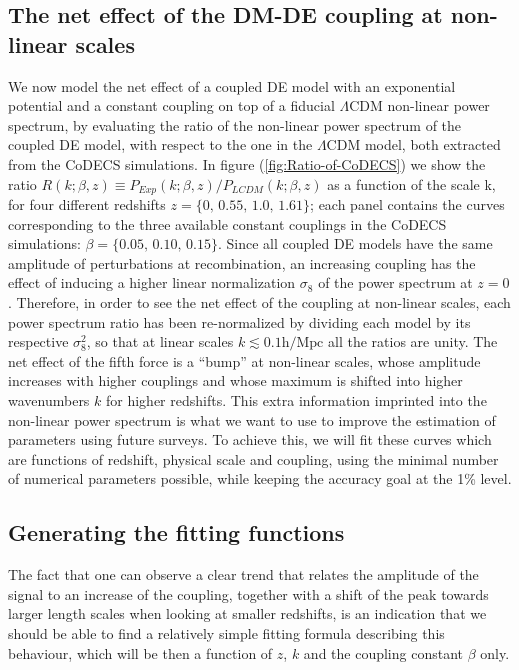 \subsection{The net effect of the DM-DE coupling at non-linear scales}

We now model the net effect of a coupled DE model with an exponential
potential and a constant coupling on top of a fiducial $\Lambda$CDM
non-linear power spectrum, by evaluating the ratio of the non-linear
power spectrum of the coupled DE model, with respect to the one in
the $\Lambda$CDM model, both extracted from the CoDECS simulations.
In figure (\ref{fig:Ratio-of-CoDECS}) we show the ratio $R(k;\beta,z)\equiv P_{Exp}(k;\beta,z)/P_{LCDM}(k;\beta,z)$
as a function of the scale k, for four different redshifts $z=\{0,\,0.55,\,1.0,\,1.61\}$;
each panel contains the curves corresponding to the three available
constant couplings in the CoDECS simulations: \textbf{$\beta=\{0.05,\,0.10,\,0.15\}$}.
Since all coupled DE models have the same amplitude of perturbations
at recombination, an increasing coupling has the effect of inducing
a higher linear normalization $\sigma_{8}$ of the power spectrum
at $z=0$ \citep{baldi_codecs_2012}. Therefore, in order to see the
net effect of the coupling at non-linear scales, each power spectrum
ratio has been re-normalized by dividing each model by its respective
$\sigma_{8}^{2}$, so that at linear scales $k\lesssim0.1\mbox{h}/\mbox{Mpc}$
all the ratios are unity. The net effect of the fifth force is a ``bump''
at non-linear scales, whose amplitude increases with higher couplings
and whose maximum is shifted into higher wavenumbers $k$ for higher
redshifts. This extra information imprinted into the non-linear power
spectrum is what we want to use to improve the estimation of parameters
using future surveys. To achieve this, we will fit these curves which
are functions of redshift, physical scale and coupling, using the
minimal number of numerical parameters possible, while keeping the
accuracy goal at the 1\% level.


\subsection{Generating the fitting functions}

The fact that one can observe a clear trend that relates the amplitude
of the signal to an increase of the coupling, together with a shift
of the peak towards larger length scales when looking at smaller redshifts,
is an indication that we should be able to find a relatively simple
fitting formula describing this behaviour, which will be then a function
of $z$, $k$ and the coupling constant $\beta$ only.

